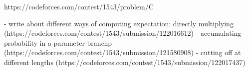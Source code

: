https://codeforces.com/contest/1543/problem/C


- write about different ways of computing expectation: directly multiplying (https://codeforces.com/contest/1543/submission/122016612)
- accumulating probability in a parameter branchp (https://codeforces.com/contest/1543/submission/121580908)
- cutting off at different lengths (https://codeforces.com/contest/1543/submission/122017437)
